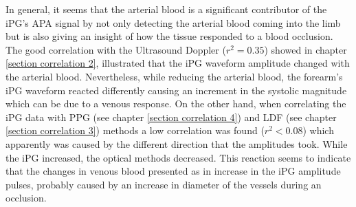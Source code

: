 In general, it seems that the arterial blood is a significant contributor of the iPG's APA signal by not only detecting the arterial blood coming into the limb but is also giving an insight of how the tissue responded to a blood occlusion. The good correlation with the Ultrasound Doppler ($r^2 = 0.35$) showed in chapter \ref{section correlation 2}, illustrated that the iPG waveform amplitude changed with the arterial blood. Nevertheless, while reducing the arterial blood, the forearm's iPG waveform reacted differently causing an increment in the systolic magnitude which can be due to a venous response. On the other hand, when correlating the iPG data with PPG (see chapter \ref{section correlation 4}) and LDF (see chapter \ref{section correlation 3}) methods a low correlation was found ($r^2 < 0.08$) which apparently was caused by the different direction that the amplitudes took. While the iPG increased, the optical methods decreased. This reaction seems to indicate that the changes in venous blood presented as in increase in the iPG amplitude pulses, probably caused by an increase in diameter of the vessels during an occlusion. 








